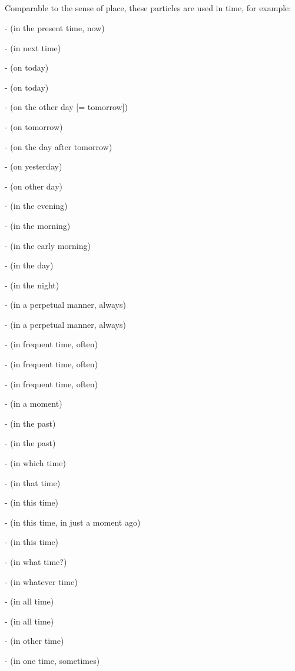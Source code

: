 \subsection*{}\label{nip:intime}
Comparable to the sense of place, these particles are used in time, for example:\par
-  (in the present time, now) \par
-  (in next time) \par
-  (on today) \par
-  (on today) \par
-  (on the other day [= tomorrow]) \par
-  (on tomorrow) \par
-  (on the day after tomorrow) \par
-  (on yesterday) \par
-  (on other day) \par
-  (in the evening) \par
-  (in the morning) \par
-  (in the early morning) \par
-  (in the day) \par
-  (in the night) \par
-  (in a perpetual manner, always) \par
-  (in a perpetual manner, always) \par
-  (in frequent time, often) \par
-  (in frequent time, often) \par
-  (in frequent time, often) \par
-  (in a moment) \par
-  (in the past) \par
-  (in the past) \par
-  (in which time) \par
-  (in that time) \par
-  (in this time) \par
-  (in this time, in just a moment ago) \par
-  (in this time) \par
-  (in what time?) \par
-  (in whatever time) \par
-  (in all time) \par
-  (in all time) \par
-  (in other time) \par
-  (in one time, sometimes) \par

